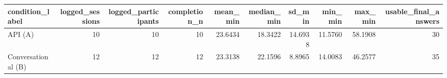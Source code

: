 \begin{tabular}{lrrrrrrrrr}
\toprule
   condition_label &  logged_sessions &  logged_participants &  completion_n &  mean_min &  median_min &  sd_min &  min_min &  max_min &  usable_final_answers \\
\midrule
           API (A) &               10 &                   10 &            10 &   23.6434 &     18.3422 & 14.6938 &  11.5760 &  58.1908 &                    30 \\
Conversational (B) &               12 &                   12 &            12 &   23.3138 &     22.1596 &  8.8965 &  14.0083 &  46.2577 &                    35 \\
\bottomrule
\end{tabular}
